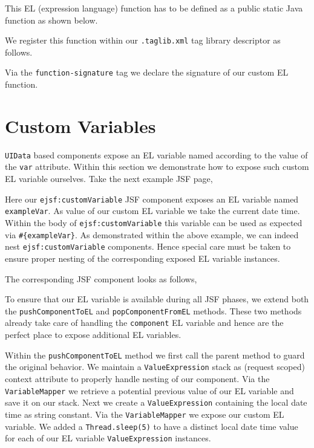 This EL (expression language) function has to be defined as a public static Java function as shown below.


We register this function within our \texttt{.taglib.xml} tag library descriptor as follows.

Via the \texttt{function-signature} tag we declare the signature of our custom EL function.

\section{Custom Variables}
\texttt{UIData} based components expose an EL variable named according to the value of the \texttt{var} attribute.
Within this section we demonstrate how to expose such custom EL variable ourselves.
Take the next example JSF page,

Here our \texttt{ejsf:customVariable} JSF component exposes an EL variable named \texttt{example\allowbreak Var}.
As value of our custom EL variable we take the current date time.
Within the body of \texttt{ejsf:custom\allowbreak Variable} this variable can be used as expected via \texttt{\#\{exampleVar\}}.
As demonstrated within the above example, we can indeed nest \texttt{ejsf:customVariable} components.
Hence special care must be taken to ensure proper nesting of the corresponding exposed EL variable instances.

The corresponding JSF component looks as follows,

To ensure that our EL variable is available during all JSF phases, we extend both the \texttt{pushComponentToEL} and \texttt{popComponentFromEL} methods.
These two methods already take care of handling the \texttt{component} EL variable and hence are the perfect place to expose additional EL variables.

Within the \texttt{pushComponentToEL} method we first call the parent method to guard the original behavior.
We maintain a \texttt{ValueExpression} stack as (request scoped) context attribute to properly handle nesting of our component.
Via the \texttt{VariableMapper} we retrieve a potential previous value of our EL variable and save it on our stack.
Next we create a \texttt{ValueExpression} containing the local date time as string constant.
Via the \texttt{VariableMapper} we expose our custom EL variable.
We added a \texttt{Thread.sleep(5)} to have a distinct local date time value for each of our EL variable \texttt{ValueExpression} instances.

